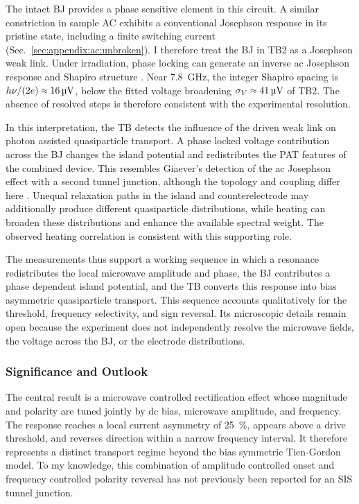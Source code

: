         The intact BJ provides a phase sensitive element in this circuit. A similar constriction in sample AC exhibits a conventional Josephson response in its pristine state, including a finite switching current (Sec.~\ref{sec:appendix:ac:unbroken}). I therefore treat the BJ in TB2 as a Josephson weak link. Under irradiation, phase locking can generate an inverse ac Josephson response and Shapiro structure \cite{shapiro_josephson_1963}. Near \qty{7.8}{\giga\hertz}, the integer Shapiro spacing is $h\nu/(2e)\sapprox\qty{16}{\micro\volt}$, below the fitted voltage broadening $\sigma_V\sapprox\qty{41}{\micro\volt}$ of TB2. The absence of resolved steps is therefore consistent with the experimental resolution.

        In this interpretation, the TB detects the influence of the driven weak link on photon assisted quasiparticle transport. A phase locked voltage contribution across the BJ changes the island potential and redistributes the PAT features of the combined device. This resembles Giaever's detection of the ac Josephson effect with a second tunnel junction, although the topology and coupling differ here \cite{giaever_detection_1965}. Unequal relaxation paths in the island and counterelectrode may additionally produce different quasiparticle distributions, while heating can broaden these distributions and enhance the available spectral weight. The observed heating correlation is consistent with this supporting role.

        The measurements thus support a working sequence in which a resonance redistributes the local microwave amplitude and phase, the BJ contributes a phase dependent island potential, and the TB converts this response into bias asymmetric quasiparticle transport. This sequence accounts qualitatively for the threshold, frequency selectivity, and sign reversal. Its microscopic details remain open because the experiment does not independently resolve the microwave fields, the voltage across the BJ, or the electrode distributions.

    \subsubsection*{Significance and Outlook}

        The central result is a microwave controlled rectification effect whose magnitude and polarity are tuned jointly by dc bias, microwave amplitude, and frequency. The response reaches a local current asymmetry of \qty{25}{\percent}, appears above a drive threshold, and reverses direction within a narrow frequency interval. It therefore represents a distinct transport regime beyond the bias symmetric Tien-Gordon model. To my knowledge, this combination of amplitude controlled onset and frequency controlled polarity reversal has not previously been reported for an SIS tunnel junction.


